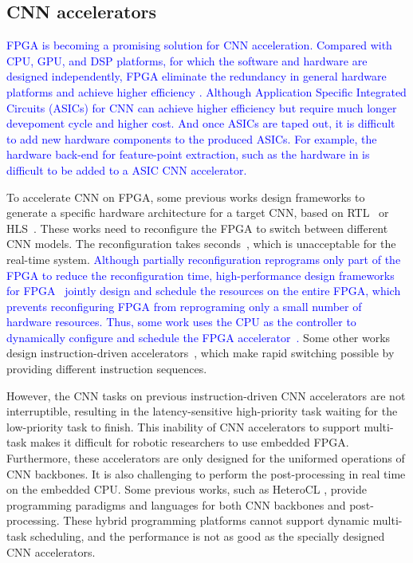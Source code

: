 \subsection{ CNN accelerators }
\textcolor{blue}{
FPGA is becoming a promising solution for CNN acceleration. 
Compared with CPU, GPU, and DSP platforms, for which the software and hardware are designed independently, FPGA eliminate the redundancy in general hardware platforms and achieve higher efficiency \cite{guo2019dl}.
Although Application Specific Integrated Circuits (ASICs) for CNN can achieve higher efficiency but require much longer devepoment cycle and higher cost. And once ASICs are taped out, it is difficult to add new hardware components to the produced ASICs.
For example, the hardware back-end for feature-point extraction, such as the hardware in  is difficult to be added to a ASIC CNN accelerator.
}

To accelerate CNN on FPGA, some previous works design frameworks to generate a specific hardware architecture for a target CNN, based on RTL~\cite{li_high_2016} or HLS~\cite{lu_evaluating_2017}. These works need to reconfigure the FPGA to switch between different CNN models. 
The reconfiguration takes seconds~\cite{FPGAPerformance}, which is unacceptable for the real-time system. 
\textcolor{blue}{
Although partially reconfiguration reprograms only part of the FPGA to reduce the reconfiguration time, high-performance design frameworks for FPGA~\cite{li_high_2016,lu_evaluating_2017} jointly design and schedule the resources on the entire FPGA, which prevents reconfiguring FPGA from reprograming only a small number of hardware resources.
Thus, some work uses the CPU as the controller to dynamically configure and schedule the FPGA accelerator~\cite{meloni2018neuraghe}.
}
Some other works design instruction-driven accelerators~\cite{gokhale2017snowflake,yu2018instruction,qiu2016going,guo2017angel,dpu}, which make rapid switching possible by providing different instruction sequences. 

However, the CNN tasks on previous instruction-driven CNN accelerators are not interruptible, resulting in the latency-sensitive high-priority task waiting for the low-priority task to finish. 
This inability of CNN accelerators to support multi-task makes it difficult for robotic researchers to use embedded FPGA. 
Furthermore, these accelerators are only designed for the uniformed operations of CNN backbones. It is also challenging to perform the post-processing in real time on the embedded CPU. 
Some previous works, such as HeteroCL \cite{lai2019heterocl}, provide programming paradigms and languages for both CNN backbones and post-processing. These hybrid programming platforms cannot support dynamic multi-task scheduling, and the performance is not as good as the specially designed CNN accelerators. 

